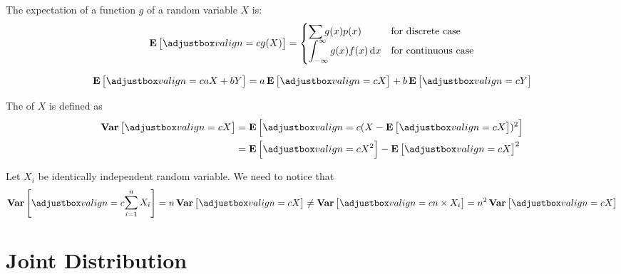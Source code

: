 \begin{theorem}
    The expectation of a function $g$  of a random variable $X$ is:
    \begin{equation}
        \expect{g(X)} = \begin{cases}
            \displaystyle \sum g(x) p(x) & \text{for discrete case} \\
            \displaystyle \int_{-\infty}^{\infty} g(x) f(x) \dif{x} & \text{for continuous case}
        \end{cases}
    \end{equation}
\end{theorem}

\begin{theorem}
    \begin{equation}
        \expect{aX + bY} = a \expect{X} + b \expect{Y}
    \end{equation}    
\end{theorem}

\begin{definition}[variance]
    The  of $X$ is defined as
    \begin{equation}
        \begin{aligned}
            \variance{X} &= \expect{(X - \expect{X})^2} \\
            &= \expect{X^2} - \expect{X}^2
        \end{aligned}
    \end{equation}
\end{definition}


\begin{theorem}
    Let $X_i$ be identically independent random variable. We need to notice that 
    \begin{equation*}
        \variance{\sum_{i=1}^n X_i} = n \variance{X} \neq \variance{n \times X_i} = n^2 \variance{X}
    \end{equation*}    
\end{theorem}



\section{Joint Distribution}

